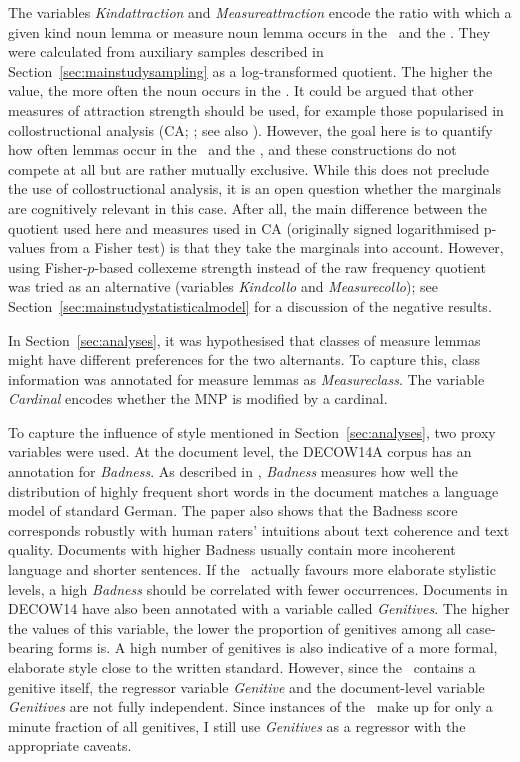 The variables \textit{Kindattraction} and \textit{Measureattraction} encode the ratio with which a given kind noun lemma or measure noun lemma occurs in the \PGCd\ and the \NACb.
They were calculated from auxiliary samples described in Section~\ref{sec:mainstudysampling} as a log-transformed quotient.
The higher the value, the more often the noun occurs in the \PGCd.
It could be argued that other measures of attraction strength should be used, for example those popularised in collostructional analysis (CA; \citealp{StefanowitschGries2003,GriesStefanowitsch2004}; see also \citealp{Gries2015a}).
However, the goal here is to quantify how often lemmas occur in the \PGCd\ and the \NACb, and these constructions do not compete at all but are rather mutually exclusive.
While this does not preclude the use of collostructional analysis, it is an open question whether the marginals are cognitively relevant in this case.
After all, the main difference between the quotient used here and measures used in CA (originally signed logarithmised p-values from a Fisher test) is that they take the marginals into account. 
However, using Fisher-$p$-based collexeme strength instead of the raw frequency quotient was tried as an alternative (variables \textit{Kindcollo} and \textit{Measurecollo}); see Section~\ref{sec:mainstudystatisticalmodel} for a discussion of the negative results.

In Section~\ref{sec:analyses}, it was hypothesised that classes of measure lemmas might have different preferences for the two alternants.
To capture this, class information was annotated for measure lemmas as \textit{Measureclass}.
The variable \textit{Cardinal} encodes whether the MNP is modified by a cardinal.

To capture the influence of style mentioned in Section~\ref{sec:analyses}, two proxy variables were used.
At the document level, the DECOW14A corpus has an annotation for \textit{Badness}.
As described in \cite{SchaeferEa2013}, \textit{Badness} measures how well the distribution of highly frequent short words in the document matches a language model of standard German.
The paper also shows that the Badness score corresponds robustly with human raters' intuitions about text coherence and text quality.
Documents with higher Badness usually contain more incoherent language and shorter sentences.
If the \PGCa\ actually favours more elaborate stylistic levels, a high \textit{Badness} should be correlated with fewer occurrences.
Documents in DECOW14 have also been annotated with a variable called \textit{Genitives}.
The higher the values of this variable, the lower the proportion of genitives among all case-bearing forms is.
A high number of genitives is also indicative of a more formal, elaborate style close to the written standard.
However, since the \PGCa\ contains a genitive itself, the regressor variable \textit{Genitive} and the document-level variable \textit{Genitives} are not fully independent.
Since instances of the \PGCa\ make up for only a minute fraction of all genitives, I still use \textit{Genitives} as a regressor with the appropriate caveats.

